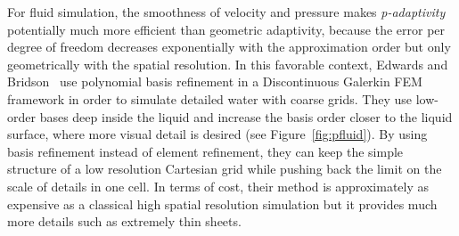 For fluid simulation, the smoothness of velocity and pressure makes \emph{p-adaptivity} potentially much more efficient than geometric adaptivity, because the error per degree of freedom decreases exponentially with the approximation order but only geometrically with the spatial resolution. In this favorable context, Edwards and Bridson~\cite{Edwards2012,Edwards2014} use polynomial basis refinement in a Discontinuous Galerkin FEM framework in order to simulate detailed water with coarse grids. They use low-order bases deep inside the liquid and increase the basis order closer to the liquid surface, where more visual detail is desired (see Figure~\ref{fig:pfluid}). By using basis refinement instead of element refinement, they can keep the simple structure of a low resolution Cartesian grid while pushing back the limit on the scale of details in one cell. In terms of cost, their method is approximately as expensive as a classical high spatial resolution simulation but it provides much more details such as extremely thin sheets.
